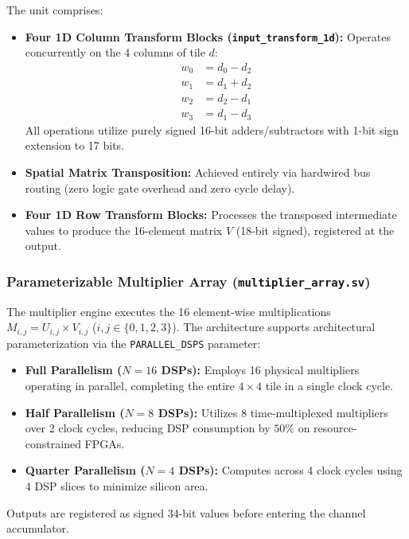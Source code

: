 \documentclass[12pt,a4paper]{article}
\begin{document}
The unit comprises:
\begin{itemize}
    \item \textbf{Four 1D Column Transform Blocks (\texttt{input\_transform\_1d}):} Operates concurrently on the 4 columns of tile $d$:
    \begin{align}
        w_0 &= d_0 - d_2 \\
        w_1 &= d_1 + d_2 \\
        w_2 &= d_2 - d_1 \\
        w_3 &= d_1 - d_3
    \end{align}
    All operations utilize purely signed 16-bit adders/subtractors with 1-bit sign extension to 17 bits.
    \item \textbf{Spatial Matrix Transposition:} Achieved entirely via hardwired bus routing (zero logic gate overhead and zero cycle delay).
    \item \textbf{Four 1D Row Transform Blocks:} Processes the transposed intermediate values to produce the 16-element matrix $V$ (18-bit signed), registered at the output.
\end{itemize}

\subsubsection{Parameterizable Multiplier Array (\texttt{multiplier\_array.sv})}
The multiplier engine executes the 16 element-wise multiplications $M_{i,j} = U_{i,j} \times V_{i,j}$ ($i,j \in \{0, 1, 2, 3\}$). The architecture supports architectural parameterization via the \texttt{PARALLEL\_DSPS} parameter:
\begin{itemize}
    \item \textbf{Full Parallelism ($N = 16$ DSPs):} Employs 16 physical multipliers operating in parallel, completing the entire $4 \times 4$ tile in a single clock cycle.
    \item \textbf{Half Parallelism ($N = 8$ DSPs):} Utilizes 8 time-multiplexed multipliers over 2 clock cycles, reducing DSP consumption by $50\%$ on resource-constrained FPGAs.
    \item \textbf{Quarter Parallelism ($N = 4$ DSPs):} Computes across 4 clock cycles using 4 DSP slices to minimize silicon area.
\end{itemize}
Outputs are registered as signed 34-bit values before entering the channel accumulator.
\end{document}

